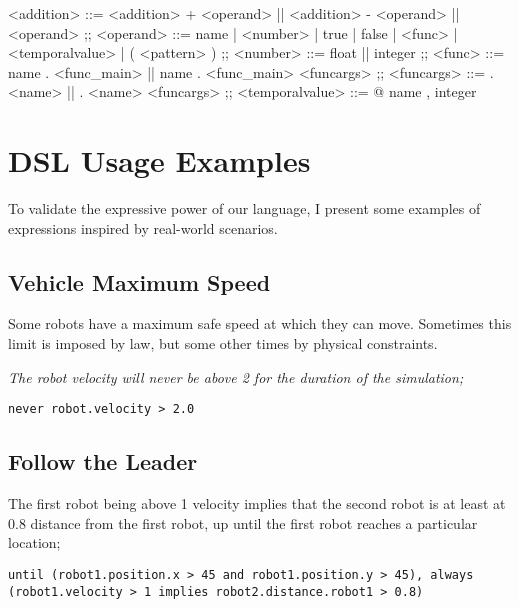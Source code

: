 \begin{bnfgrammar}
    <addition> ::= <addition> + <operand>
    || <addition> - <operand>
    || <operand>
    ;;
    <operand> ::= 
    name | <number> | true | false | <func> | <temporalvalue> | ( <pattern> )
    ;;
    <number> ::= 
    float || integer
    ;;
    <func> ::= 
    name . <func\_main>
    || name . <func\_main> <funcargs>
    ;;
    <funcargs> ::= 
    . <name> || . <name> <funcargs>
    ;;
    <temporalvalue> ::= 
    @ { name , integer }
\end{bnfgrammar}

\section{DSL Usage Examples}
\label{sec:languageexamples}
To validate the expressive power of our language, I present some examples of expressions inspired by real-world scenarios.


\subsection{Vehicle Maximum Speed}
\label{sec:speedexample}

Some robots have a maximum safe speed at which they can move. Sometimes this limit is imposed by law, but some other times by physical constraints.

\textit{The robot velocity will never be above 2 for the duration of the simulation;}

\begin{lstlisting}
never robot.velocity > 2.0	
\end{lstlisting}


\subsection{Follow the Leader}
\label{ssec:followexample}

The first robot being above 1 velocity implies that the second robot is at least at 0.8 distance from the first robot, up until the first robot reaches a particular location;

\begin{lstlisting}
until (robot1.position.x > 45 and robot1.position.y > 45), always (robot1.velocity > 1 implies robot2.distance.robot1 > 0.8)
\end{lstlisting}


